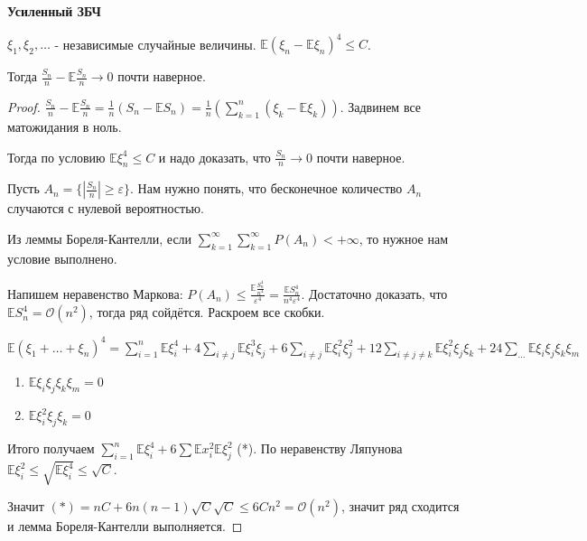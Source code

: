 \begin{theorem}
    \textbf{Усиленный ЗБЧ}

    $\xi_1, \xi_2, \ldots$ - независимые случайные величины. 
    $\mathbb{E} (\xi_n - \mathbb{E}\xi_n)^4 \leqslant C$.

    Тогда $\frac{S_n}{n} - \mathbb{E} \frac{S_n}{n} \rightarrow 0$ почти наверное.
\end{theorem}

\begin{proof}
    $\frac{S_n}{n} - \mathbb{E}\frac{S_n}{n} = \frac{1}{n} (S_n - \mathbb{E}S_n) = \frac{1}{n}(\sum_{k = 1}^n (\xi_k - \mathbb{E}\xi_k))$. Задвинем все
    матожидания в ноль.

    Тогда по условию $\mathbb{E} \xi_n^4 \leqslant C$ и надо доказать, что $\frac{S_n}{n} \rightarrow 0$ почти наверное.
    
    Пусть $A_n = \{ \left | \frac{S_n}{n} \right | \geqslant \varepsilon \}$. Нам нужно понять, что бесконечное количество $A_n$ случаются
    с нулевой вероятностью. 

    Из леммы Бореля-Кантелли, если $\sum_{k = 1}^{\infty} \sum_{k = 1}^{\infty} P(A_n) < +\infty$, то нужное нам условие выполнено.

    Напишем неравенство Маркова: $P(A_n) \leqslant \frac{\mathbb{E} \frac{S_n^4}{n^4}}{\varepsilon^4} = \frac{\mathbb{E}S_n^4}{n^4\varepsilon^4}$. Достаточно доказать, что
    $\mathbb{E}S_n^4 = \mathcal{O}(n^2)$, тогда ряд сойдётся. Раскроем все скобки.

    $\mathbb{E}(\xi_1 + \ldots + \xi_n)^4 = \sum_{i = 1}^n \mathbb{E}\xi_i^4 + 4\sum_{i \neq j}\mathbb{E}\xi_i^3\xi_j +
     6\sum_{i \neq j}\mathbb{E}\xi_i^2 \xi_j^2 + 12\sum_{i \neq j \neq k} \mathbb{E} \xi_i^2 \xi_j \xi_k + 24\sum_{\ldots} \mathbb{E}\xi_i \xi_j \xi_k \xi_m$

    \begin{enumerate}
        \item {
            $\mathbb{E}\xi_i \xi_j \xi_k \xi_m = 0$
        }
        \item {
            $\mathbb{E} \xi_i^2 \xi_j \xi_k = 0$
        }
    \end{enumerate}

    Итого получаем $\sum_{i = 1}^n \mathbb{E}\xi_i^4 + 6 \sum \mathbb{E}x_i^2 \mathbb{E}\xi_j^2$ (*). По неравенству Ляпунова
    $\mathbb{E}\xi_i^2 \leqslant \sqrt{\mathbb{E}\xi_i^4} \leqslant \sqrt{C}$.

    Значит $(*) = nC + 6n(n-1)\sqrt{C}\sqrt{C} \leqslant 6Cn^2 = \mathcal{O}(n^2)$, значит ряд сходится и лемма Бореля-Кантелли выполняется.
\end{proof}

